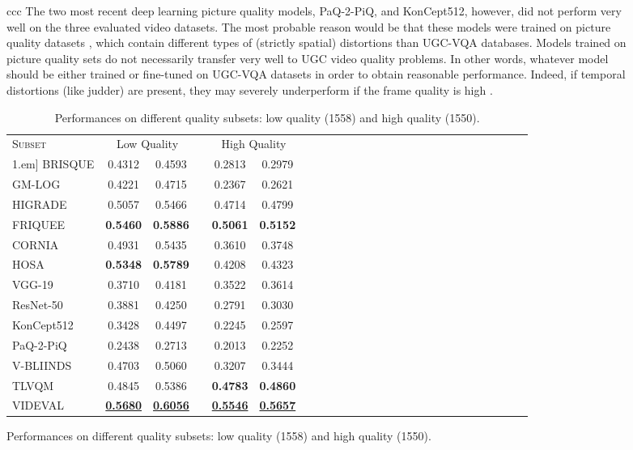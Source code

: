 \documentclass[journal]{IEEEtran}
\begin{document}
\begin{figure}[!t]
\begin{tabular}{ccc}
{The two most recent deep learning picture quality models, PaQ-2-PiQ, and KonCept512, however, did not perform very well on the three evaluated video datasets. The most probable reason would be that these models were trained on picture quality datasets \cite{ying2019patches, hosu2020koniq}, which contain different types of (strictly spatial) distortions than UGC-VQA databases. Models trained on picture quality sets do not necessarily transfer very well to UGC video quality problems. In other words, whatever model should be either trained or fine-tuned on UGC-VQA datasets in order to obtain reasonable performance. Indeed, if temporal distortions (like judder) are present, they may severely underperform if the frame quality is high \cite{madhusudana2020subjective}.}

\begin{table}[!t]
\setlength{\tabcolsep}{4pt}
\renewcommand{\arraystretch}{1.1}
\centering
\caption{Performances on different quality subsets: low quality (1558) and high quality (1550).}
\label{table:quality_breakdown}
\begin{tabular}{lccccccccccccccccccccccccc}
\toprule
\textsc{Subset} & \multicolumn{2}{c}{Low Quality} & & \multicolumn{2}{c}{High Quality} \\ \cline{2-3}\cline{5-6}\-1.em]
BRISQUE   & 0.4312 & 0.4593 & & 0.2813 & 0.2979   \\
GM-LOG    & 0.4221 & 0.4715 & & 0.2367 & 0.2621   \\
HIGRADE   & 0.5057 & 0.5466 & & 0.4714 & 0.4799   \\
FRIQUEE   & \textbf{0.5460} & \textbf{0.5886} & & \textbf{0.5061} & \textbf{0.5152}   \\
CORNIA    & 0.4931 & 0.5435 & & 0.3610 & 0.3748   \\
HOSA      & \textbf{0.5348} & \textbf{0.5789} & & 0.4208 & 0.4323   \\
VGG-19     & 0.3710 & 0.4181 & & 0.3522 & 0.3614   \\
ResNet-50  & 0.3881 & 0.4250 & & 0.2791 & 0.3030   \\
{KonCept512} & 0.3428 & 0.4497 & & 0.2245 & 0.2597 & \\
{PaQ-2-PiQ} & 0.2438 & 0.2713 & & 0.2013 & 0.2252 \\
V-BLIINDS & 0.4703 & 0.5060 & & 0.3207 & 0.3444   \\
TLVQM     & 0.4845 & 0.5386 & & \textbf{0.4783} & \textbf{0.4860}   \\
VIDEVAL   & \textbf{\underline{0.5680}} & \textbf{\underline{0.6056}} & & \textbf{\underline{0.5546}} & \textbf{\underline{0.5657}} \\
\bottomrule
\end{tabular}
\end{table}


\end{tabular}
\end{figure}
\end{document}
